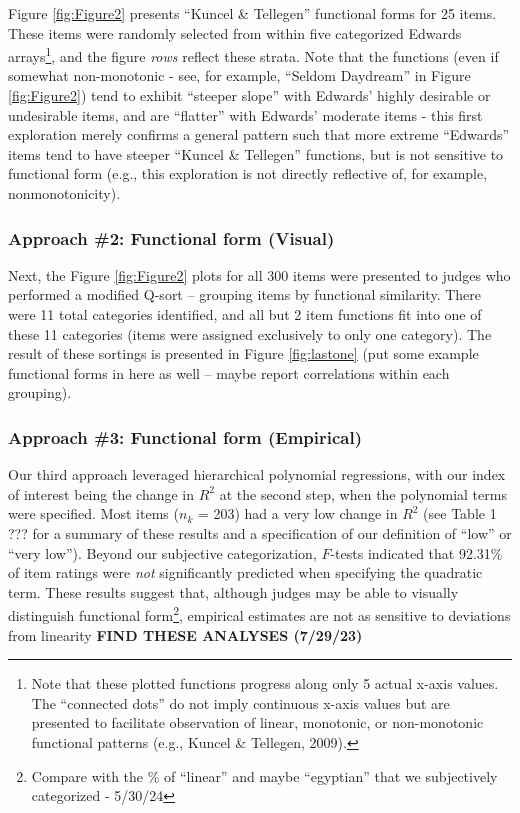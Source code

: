 \documentclass[
  ,jou]{apa6}
\begin{document}
Figure \ref{fig:Figure2} presents ``Kuncel \& Tellegen'' functional forms for 25 items. These items were randomly selected from within five categorized Edwards arrays\footnote{Note that these plotted functions progress along only 5 actual x-axis values. The ``connected dots'' do not imply continuous x-axis values but are presented to facilitate observation of linear, monotonic, or non-monotonic functional patterns (e.g., Kuncel \& Tellegen, 2009).}, and the figure \emph{rows} reflect these strata. Note that the functions (even if somewhat non-monotonic - see, for example, ``Seldom Daydream'' in Figure \ref{fig:Figure2}) tend to exhibit ``steeper slope'' with Edwards' highly desirable or undesirable items, and are ``flatter'' with Edwards' moderate items - this first exploration merely confirms a general pattern such that more extreme ``Edwards'' items tend to have steeper ``Kuncel \& Tellegen'' functions, but is not sensitive to functional form (e.g., this exploration is not directly reflective of, for example, nonmonotonicity).

\hypertarget{approach-2-functional-form-visual}{%
\subsubsection{Approach \#2: Functional form (Visual)}\label{approach-2-functional-form-visual}}

Next, the Figure \ref{fig:Figure2} plots for all 300 items were presented to judges who performed a modified Q-sort -- grouping items by functional similarity. There were 11 total categories identified, and all but 2 item functions fit into one of these 11 categories (items were assigned exclusively to only one category). The result of these sortings is presented in Figure \ref{fig:lastone} (put some example functional forms in here as well -- maybe report correlations within each grouping).

\hypertarget{approach-3-functional-form-empirical}{%
\subsubsection{Approach \#3: Functional form (Empirical)}\label{approach-3-functional-form-empirical}}

Our third approach leveraged hierarchical polynomial regressions, with our index of interest being the change in \(R^2\) at the second step, when the polynomial terms were specified. Most items (\(n_k\) = 203) had a very low change in \(R^2\) (see Table 1 ??? for a summary of these results and a specification of our definition of ``low'' or ``very low''). Beyond our subjective categorization, \(F\)-tests indicated that 92.31\% of item ratings were \emph{not} significantly predicted when specifying the quadratic term. These results suggest that, although judges may be able to visually distinguish functional form\footnote{Compare with the \% of ``linear'' and maybe ``egyptian'' that we subjectively categorized - 5/30/24}, empirical estimates are not as sensitive to deviations from linearity \textbf{FIND THESE ANALYSES (7/29/23)}
\end{document}
